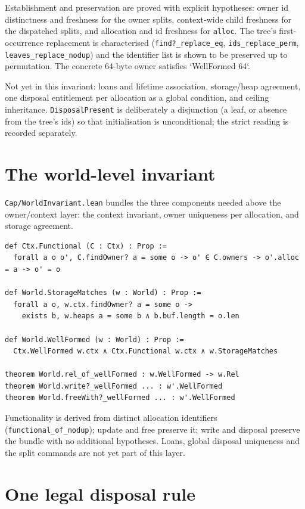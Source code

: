 \documentclass[10pt,a4paper]{article}
\newcommand{\file}[1]{\texttt{\small #1}}
\begin{document}
Establishment and preservation are proved with explicit hypotheses: owner id
distinctness and freshness for the owner splits, context-wide child freshness for
the dispatched splits, and allocation and id freshness for \texttt{alloc}. The tree's
first-occurrence replacement is characterised (\texttt{find?\_replace\_eq},
\texttt{ids\_replace\_perm}, \texttt{leaves\_replace\_nodup}) and the identifier list is shown to be
preserved up to permutation. The concrete 64-byte owner satisfies `WellFormed 64`.

Not yet in this invariant: loans and lifetime association, storage/heap agreement,
one disposal entitlement per allocation as a global condition, and ceiling
inheritance. \texttt{DisposalPresent} is deliberately a disjunction (a leaf, or absence
from the tree's ids) so that initialisation is unconditional; the strict reading is
recorded separately.

\section{The world-level invariant}

\file{Cap/WorldInvariant.lean} bundles the three components needed above the
owner/context layer: the context invariant, owner uniqueness per allocation, and
storage agreement.

\begin{lstlisting}[caption={\file{Cap/WorldInvariant.lean}.}]
def Ctx.Functional (C : Ctx) : Prop :=
  forall a o o', C.findOwner? a = some o -> o' ∈ C.owners -> o'.alloc = a -> o' = o

def World.StorageMatches (w : World) : Prop :=
  forall a o, w.ctx.findOwner? a = some o ->
    exists b, w.heaps a = some b ∧ b.buf.length = o.len

def World.WellFormed (w : World) : Prop :=
  Ctx.WellFormed w.ctx ∧ Ctx.Functional w.ctx ∧ w.StorageMatches

theorem World.rel_of_wellFormed : w.WellFormed -> w.Rel
theorem World.write?_wellFormed ... : w'.WellFormed
theorem World.freeWith?_wellFormed ... : w'.WellFormed
\end{lstlisting}

Functionality is derived from distinct allocation identifiers
(\texttt{functional\_of\_nodup}); update and free preserve it; write and disposal
preserve the bundle with no additional hypotheses. Loans, global disposal
uniqueness and the split commands are not yet part of this layer.

\section{One legal disposal rule}
\end{document}
